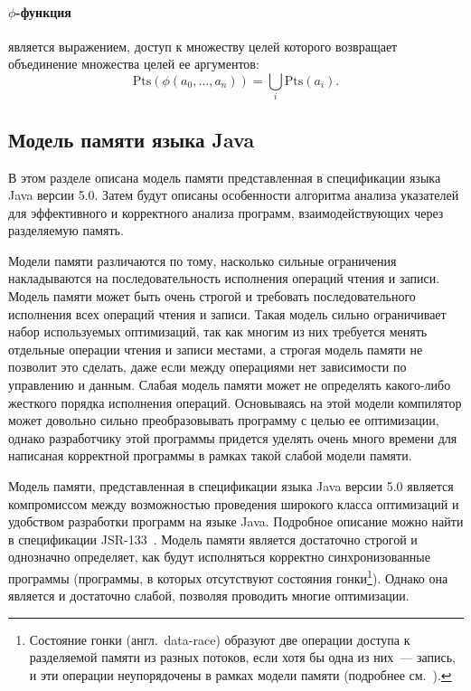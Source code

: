 \documentclass[14pt,titlepage]{extarticle}
\newcommand{\Pts}[1]{\textrm{Pts}(#1)}
\let\oldphi\phi
\renewcommand{\phi}{\ensuremath{\oldphi}}
\newcommand{\eng}[1]{{\English#1}}
\newcommand{\engdef}[1]{(англ.~\eng{#1})}
\begin{document}
        \paragraph{\phi-функция} является выражением, доступ к множеству целей
        которого возвращает объединение множества целей ее аргументов:
        \[\Pts{\phi(a_0, \ldots, a_n)} = \bigcup\limits_{i} \Pts{a_i}.\]

    \subsection{Модель памяти языка Java}

      В этом разделе описана модель памяти представленная в спецификации языка
      Java версии 5.0.
      Затем будут описаны особенности алгоритма анализа указателей для
      эффективного и корректного анализа программ, взаимодействующих через
      разделяемую память.

      Модели памяти различаются по тому, насколько сильные ограничения
      накладываются на последовательность исполнения операций чтения и
      записи.
      Модель памяти может быть очень строгой и требовать
      последовательного исполнения всех операций чтения и записи.
      Такая модель сильно ограничивает набор используемых оптимизаций,
      так как многим из них требуется менять отдельные операции чтения и
      записи местами, а строгая модель памяти не позволит это сделать, даже
      если между операциями нет зависимости по управлению и данным.
      Слабая модель памяти может не определять какого-либо жесткого порядка
      исполнения операций. Основываясь на этой модели компилятор может
      довольно сильно преобразовывать программу с целью ее оптимизации,
      однако разработчику этой программы придется уделять очень много времени
      для написаная корректной программы в рамках такой слабой модели памяти.

      Модель памяти, представленная в спецификации языка Java версии 5.0
      является компромиссом между возможностью проведения широкого класса
      оптимизаций и удобством разработки программ на языке Java. Подробное
      описание можно найти в спецификации JSR-133~\cite{jsr133}. Модель памяти
      является достаточно строгой и однозначно определяет, как будут
      исполняться корректно синхронизованные программы (программы, в которых
      отсутствуют состояния гонки\footnote{Состояние гонки
      \engdef{data-race} образуют две операции доступа к
      разделяемой памяти из разных потоков, если хотя бы одна из них~---
      запись, и эти операции неупорядочены в рамках модели памяти (подробнее
      см.~\cite[раздел~2.1]{manson_jmm}).}).
      Однако она является и достаточно слабой, позволяя проводить многие
      оптимизации.
\end{document}
